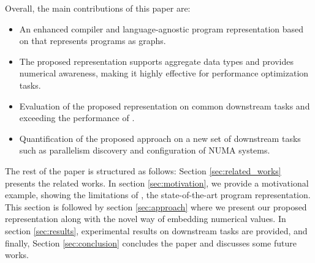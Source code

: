 \vspace{-1pt}
Overall, the main contributions of this paper are:
\vspace{-3pt}
\begin{itemize}[leftmargin=15pt, itemsep=0pt, parsep=3pt, topsep=0pt]
    \item An enhanced compiler and language-agnostic program representation based on \programl that represents programs as graphs.
    \item The proposed representation supports aggregate data types and provides numerical awareness, making it highly effective for performance optimization tasks.
    \item Evaluation of the proposed representation on common downstream tasks and exceeding the performance of \programl.
    \item Quantification of the proposed approach on a new set of downstream tasks such as parallelism discovery and configuration of NUMA systems.
\end{itemize}
\vspace{-2pt}

The rest of the paper is structured as follows: Section \ref{sec:related_works} presents the related works. In section \ref{sec:motivation}, we provide a motivational example, showing the limitations of \programl, the state-of-the-art program representation. This section is followed by section \ref{sec:approach} where we present our proposed representation \ourtool along with the novel way of embedding numerical values. In section \ref{sec:results}, experimental results on downstream tasks are provided, and finally, Section \ref{sec:conclusion} concludes the paper and discusses some future works.

\vspace{-8pt}